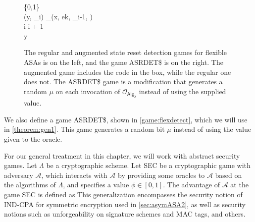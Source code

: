\begin{figure}
\begin{pchstack}
\begin{pcvstack}
{	\pcind \mu \sample \{0,1\} \\
	\pcind (y, \tau_i) \sample {}_\lambda(x, ek, \tau_{i-1}, \mu) \\
	\pcind i \leftarrow i + 1 \\
	\pcreturn y
}
\end{pcvstack}
\end{pchstack}
\caption[The regular and augmented state reset detection games for flexible ASAs and the game ASRDET\$]{The regular and augmented state reset detection games for flexible ASAs is on the left, and the game ASRDET\$ is on the right. The augmented game includes the code in the box, while the regular one does not. The ASRDET\$ game is a modification that generates a random $\mu$ on each invocation of $\mathcal{O}_{\mathsf{Alg}_\lambda}$ instead of using the supplied value.}
\label{game:flexdetect}
\end{figure}

We also define a game ASRDET\$, shown in \autoref{game:flexdetect}, which we will use in \autoref{theorem:gen1}. This game generates a random bit $\mu$ instead of using the value given to the oracle.

For our general treatment in this chapter, we will work with abstract security games. Let $\mathsf{\Lambda}$ be a cryptographic scheme. Let SEC be a cryptographic game with adversary $\mathcal{A}$, which interacts with $\mathcal{A}$ by providing some oracles to $\mathcal{A}$ based on the algorithms of $\mathsf{\Lambda}$, and specifies a value $\phi \in [0,1]$. The advantage of $\mathcal{A}$ at the game SEC is defined as
This generalization encompasses the security notion of IND-CPA for symmetric encryption used in \autoref{sec:asymASA2}, as well as security notions such as unforgeability on signature schemes and MAC tags, and others.

